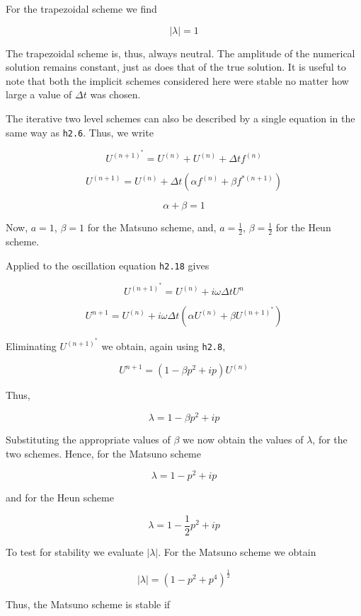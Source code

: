 For the trapezoidal scheme we find

\[| \lambda | = 1\]

The trapezoidal scheme is, thus, always neutral. The amplitude of the
numerical solution remains constant, just as does that of the true
solution. It is useful to note that both the implicit schemes considered
here were stable no matter how large a value of \(\Delta t\) was chosen.

The iterative two level schemes can also be described by a single
equation in the same way as \texttt{h2.6}. Thus, we write

\[U^{\left( n + 1 \right)^{*}} = U^{\left( n \right)} + U^{\left( n \right)} + \Delta t{ f}^{\left( n \right)}\]

\[U^{\left( n + 1 \right)} = U^{\left( n \right)} + \Delta t\left( \alpha f^{\left( n \right)} + \beta f^{*\left( n + 1 \right)} \right)\]

\[\alpha + \beta = 1\]

Now, \(a = 1\), \(\beta = 1\) for the Matsuno scheme, and,
\(a = \frac{1}{2}\), \(\beta = \frac{1}{2}\) for the Heun scheme.

Applied to the oscillation equation \texttt{h2.18} gives

\[U^{\left( n + 1 \right)^{*}} = U^{\left( n \right)} + i\omega \Delta t U^n\]

\[U^{n + 1} = U^{\left( n \right)} + i\omega\Delta t\left( \alpha U^{\left( n \right)} + \beta U^{\left( n + 1 \right)^{*}} \right)\]

Eliminating \(U^{\left( n + 1 \right)^{*}}\) we obtain, again using
\texttt{h2.8},

\[U^{n + 1} = \left( 1 - \beta p^{2} + ip \right)U^{\left( n \right)}\]

Thus,

\[\lambda = 1 - \beta p^{2} + ip\]

Substituting the appropriate values of \(\beta\) we now obtain the
values of \(\lambda\), for the two schemes. Hence, for the Matsuno
scheme

\[\lambda = 1 - p^{2} + ip\]

and for the Heun scheme

\[\lambda = 1 - \frac{1}{2}p^{2} + i p\]

To test for stability we evaluate \(| \lambda |\). For the Matsuno
scheme we obtain

\[| \lambda | = \left( 1 - p^{2} + p^{4} \right)^{\frac{1}{2}}\]

Thus, the Matsuno scheme is stable if

